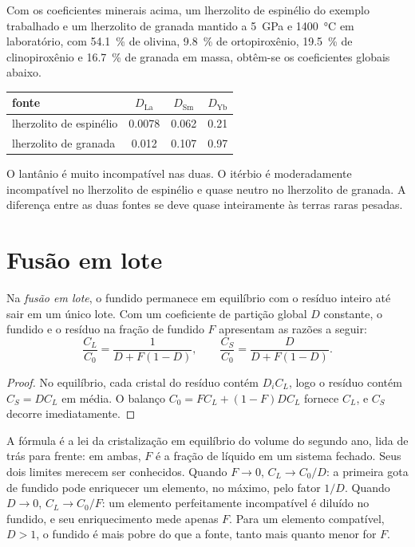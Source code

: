 Com os coeficientes minerais acima, um lherzolito de espinélio do exemplo trabalhado
e um lherzolito de granada mantido a \qty{5}{GPa} e \qty{1400}{\celsius} em laboratório,
com \qty{54.1}{\percent} de olivina, \qty{9.8}{\percent} de ortopiroxênio,
\qty{19.5}{\percent} de clinopiroxênio e \qty{16.7}{\percent} de granada em massa,
obtêm-se os coeficientes globais abaixo.
\begin{center}
\small
\begin{tabular}{lccc}
\hline
fonte & $D_{\mathrm{La}}$ & $D_{\mathrm{Sm}}$ & $D_{\mathrm{Yb}}$ \\
\hline
lherzolito de espinélio & 0.0078 & 0.062 & 0.21 \\
lherzolito de granada & 0.012 & 0.107 & 0.97 \\
\hline
\end{tabular}
\end{center}
O lantânio é muito incompatível nas duas. O itérbio é moderadamente incompatível
no lherzolito de espinélio e quase neutro no lherzolito de granada. A diferença
entre as duas fontes se deve quase inteiramente
às terras raras pesadas.

\section{Fusão em lote}\label{sec:b3:trace-element-modelling:batch}

\begin{theorem}\label{thm:b3:trace-element-modelling:batch}
Na \emph{fusão em lote}, o fundido permanece em equilíbrio
com o resíduo inteiro até sair em um único lote. Com um coeficiente de partição
global $D$ constante, o fundido e o resíduo na fração de fundido $F$ apresentam
as razões a seguir:
\[
\frac{C_L}{C_0} = \frac{1}{D + F(1 - D)}, \qquad
\frac{C_S}{C_0} = \frac{D}{D + F(1 - D)}.
\]
\end{theorem}

\begin{proof}
No equilíbrio, cada cristal do resíduo contém $D_iC_L$, logo o resíduo
contém $C_S = DC_L$ em média. O balanço $C_0 = FC_L + (1 - F)DC_L$ fornece
$C_L$, e $C_S$ decorre imediatamente.
\end{proof}

A fórmula é a lei da cristalização em equilíbrio do volume do segundo ano, lida
de trás para frente: em ambas, $F$ é a fração de líquido em um sistema fechado. Seus dois
limites merecem ser conhecidos. Quando $F \to 0$, $C_L \to C_0/D$: a primeira gota de fundido
pode enriquecer um elemento, no máximo, pelo fator $1/D$. Quando $D \to 0$, $C_L \to
C_0/F$: um elemento perfeitamente incompatível é diluído no fundido, e seu
enriquecimento mede apenas $F$. Para um elemento compatível, $D > 1$, o fundido é
mais pobre do que a fonte, tanto mais quanto menor for $F$.

